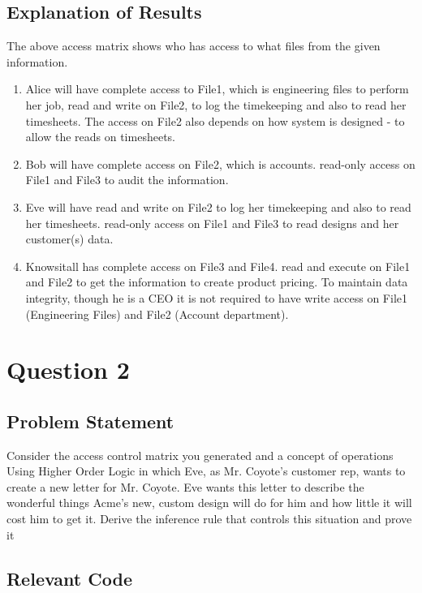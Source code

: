 \documentclass{report}
\begin{document}
\section{Explanation of Results}
\label{sec:explanation-results-1}
The above access matrix shows who has access to what files from the given information.
\begin{enumerate}
\item Alice will have complete access to File1, which is engineering files to perform her job,
      read and write on File2, to log the timekeeping and also to read her timesheets. The access 
       on File2 also depends on how system is designed - to allow the reads on timesheets.
\item Bob will have complete access on File2, which is accounts.
      read-only access on File1 and File3 to audit the information.
\item Eve will have read and write on File2 to log her timekeeping and also to read her timesheets.
      read-only access on File1 and File3 to read designs and her customer(s) data.
\item Knowsitall has complete access on File3 and File4.
    read and execute on File1 and File2 to get the information to create product pricing.
    To maintain data integrity, though he is a CEO it is not required to have write access on 
    File1 (Engineering Files) and File2 (Account department).
\end{enumerate}


 \chapter{Question 2}
 \label{cha:ques2}
  
 \section{Problem Statement}
 \label{sec:problem-statement-2}

 Consider the access control matrix you generated and a concept of
 operations Using Higher Order Logic in which Eve, as Mr. Coyote’s
 customer rep, wants to create a new letter for Mr.  Coyote. Eve wants
 this letter to describe the wonderful things Acme’s new, custom
 design will do for him and how little it will cost him to get
 it. Derive the inference rule that controls this situation and prove
 it

\section{Relevant Code}
\label{sec:relevant-code-2}
\end{document}
